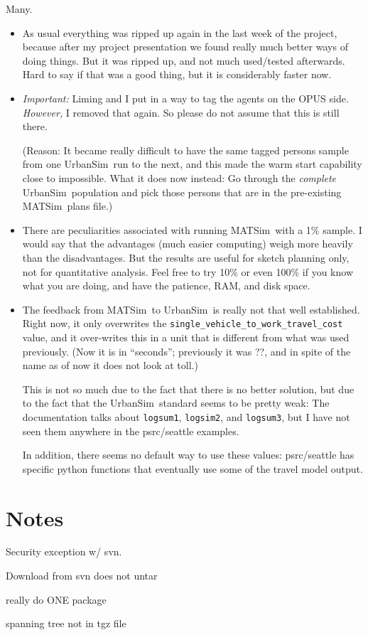 \documentclass{article}
\def\matsim{MATSim}
\def\urbansim{UrbanSim}
\begin{document}
Many.  
\begin{itemize}

\item As usual everything was ripped up again in the last week of the
project, because after my project presentation we found really much
better ways of doing things.  But it was ripped up, and not much
used/tested afterwards.  Hard to say if that was a good thing, but it
is considerably faster now.

\item
\emph{Important:} Liming and I put in a way to tag the agents on the
OPUS side.  \emph{However,} I removed that again.  So please do not
assume that this is still there.

(Reason: It became really difficult to have the same tagged persons
sample from one \urbansim\ run to the next, and this made the warm
start capability close to impossible.  What it does now instead: Go
through the \emph{complete} \urbansim\ population and pick those
persons that are in the pre-existing \matsim\ plans file.)

\item There are peculiarities associated with running \matsim\ with a
1\% sample.  I would say that the advantages (much easier computing)
weigh more heavily than the disadvantages.  But the results are
useful for sketch planning only, not for quantitative analysis.  Feel
free to try 10\% or even 100\% if you know what you are doing, and
have the patience, RAM, and disk space.

\item The feedback from \matsim\ to \urbansim\ is really not that well
established.  Right now, it only overwrites the
\verb$single_vehicle_to_work_travel_cost$ value, and it over-writes
this in a unit that is different from what was used previously.
(Now it is in ``seconds''; previously it was ??, and in spite of the
name as of now it does not look at toll.)

This is not so much due to the fact that there is no better solution,
but due to the fact that the \urbansim\ standard seems to be pretty
weak: The documentation talks about \verb$logsum1$, \verb$logsim2$,
and \verb$logsum3$, but I have not seen them anywhere in the
psrc/seattle examples.

In addition, there seems no default way to use these values:
psrc/seattle has specific python functions that eventually use some of
the travel model output.

\end{itemize}

\section{Notes}

Security exception w/ svn.

Download from svn does not untar

really do ONE package

spanning tree not in tgz file
\end{document}

